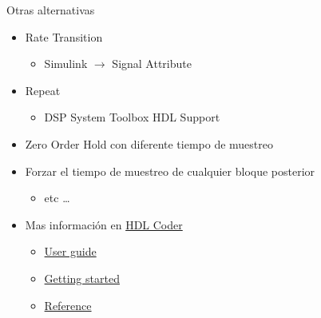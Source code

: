 \documentclass{beamer}
\begin{document}
\begin{frame}{Otras alternativas}
	\begin{itemize}
		\item Rate Transition
		\begin{itemize}
			\item Simulink $\rightarrow$ Signal Attribute
		\end{itemize}
		\item Repeat 
		\begin{itemize}
			\item DSP System Toolbox HDL Support
		\end{itemize}
		\item Zero Order Hold con diferente tiempo de muestreo
		\item Forzar el tiempo de muestreo de cualquier bloque posterior
		\begin{itemize}
			\item etc \ldots
		\end{itemize}
	\end{itemize}
	\begin{itemize}
		\item Mas información en \href{https://www.mathworks.com/products/hdl-coder.html}{HDL Coder}
		\begin{itemize}
			\item \href{https://www.mathworks.com/help/pdf_doc/hdlcoder/hdlcoder_ug.pdf}{User guide}
			\item \href{https://www.mathworks.com/help/pdf_doc/hdlcoder/hdlcoder_gs.pdf}{Getting started}
			\item \href{https://www.mathworks.com/help/pdf_doc/hdlcoder/hdlcoder_ref.pdf}{Reference}
		\end{itemize}
	\end{itemize}
\end{frame}
\end{document}
